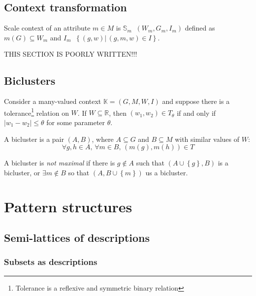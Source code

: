 \documentclass[a4paper]{article}
\newcommand{\obj}[1]{{\left\{ #1 \right \}}}
\newcommand{\brac}[1]{{\left ( #1 \right )}}
\newcommand{\induc}[1]{{\left . #1 \right \vert}}
\newcommand{\abs}[1]{{\left | #1 \right |}}
\newcommand{\Real}{\mathbb{R}}
\newcommand{\Ctx}{\mathbb{K}}
\newcommand{\defn}{\mathop{\overset{\Delta}{=}}\nolimits}
\begin{document}

\subsection{Context transformation} %
\label{sub:context_transformation}

Scale context of an attribute $m\in M$ is $\mathbb{S}_m\defn \brac{W_m, G_m, I_m}$ defined as $m(G) \subseteq W_m$ and $I_m\defn \obj{ \induc{(g,w)}\,(g,m,w)\in I }$.

THIS SECTION IS POORLY WRITTEN!!!


\subsection{Biclusters} %
\label{sub:biclusters}
Consider a many-valued context $\Ctx=\brac{G,M,W,I}$ and suppose there is a tolerance\footnote{Tolerance is a reflexive and symmetric binary relation} relation on $W$. If $W\subseteq \Real$, then $(w_1,w_2)\in T_\theta$ if and only if $\abs{w_1-w_2}\leq \theta$ for some parameter $\theta$.

A bicluster is a pair $(A,B)$, where $A\subseteq G$ and $B\subseteq M$ with similar values of $W$:\[\forall g,h\in A,\, \forall m\in B,\,\brac{m(g), m(h)}\in T\]

A bicluster is \emph{not maximal} if there is $g\notin A$ such that $\brac{A\cup\obj{g},B}$ is a bicluster, or $\exists m\notin B$ so that $\brac{A,B\cup\obj{m}}$ us a bicluster.



\section{Pattern structures} %
\label{sec:pattern_structures}

\subsection{Semi-lattices of descriptions} %
\label{sub:semi_lattices_of_descriptions}

\subsubsection*{Subsets as descriptions} %
\label{ssub:subsets_as_descriptions}
\end{document}
